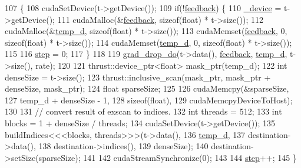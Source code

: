 \begin{DoxyCode}
107                                                                          \{
108     cudaSetDevice(t->getDevice());
109     \textcolor{keywordflow}{if}(!\hyperlink{classmarian_1_1GradientDropBase_aba05eed3ccef8a7a9907265c5bb71113}{feedback}) \{
110       \hyperlink{classmarian_1_1GradientDropBase_a2ad2b7d1cb32b380dbf5e87672f0cf55}{\_device} = t->getDevice();
111       cudaMalloc(&\hyperlink{classmarian_1_1GradientDropBase_aba05eed3ccef8a7a9907265c5bb71113}{feedback}, \textcolor{keyword}{sizeof}(\textcolor{keywordtype}{float}) * t->size());
112       cudaMalloc(&\hyperlink{classmarian_1_1GradientDropBase_a90fc3332c4dbfbb0e59e421db411be27}{temp\_d}, \textcolor{keyword}{sizeof}(\textcolor{keywordtype}{float}) * t->size());
113       cudaMemset(\hyperlink{classmarian_1_1GradientDropBase_aba05eed3ccef8a7a9907265c5bb71113}{feedback}, 0, \textcolor{keyword}{sizeof}(\textcolor{keywordtype}{float}) * t->size());
114       cudaMemset(\hyperlink{classmarian_1_1GradientDropBase_a90fc3332c4dbfbb0e59e421db411be27}{temp\_d}, 0, \textcolor{keyword}{sizeof}(\textcolor{keywordtype}{float}) * t->size());
115 
116       \hyperlink{classmarian_1_1GradientDropBase_acead9d9d021ef412b7e62776c96a5e51}{step} = 0;
117     \}
118 
119     \hyperlink{classmarian_1_1GradientDropBase_af88d41a0e4f999745653b61276426d8a}{grad\_drop\_do}(t->data(), \hyperlink{classmarian_1_1GradientDropBase_aba05eed3ccef8a7a9907265c5bb71113}{feedback}, \hyperlink{classmarian_1_1GradientDropBase_a90fc3332c4dbfbb0e59e421db411be27}{temp\_d}, t->size(), rate);
120 
121     thrust::device\_ptr<float> mask\_ptr(temp\_d);
122     \textcolor{keywordtype}{int} denseSize = t->size();
123     thrust::inclusive\_scan(mask\_ptr, mask\_ptr + denseSize, mask\_ptr);
124     \textcolor{keywordtype}{float} sparseSize;
125 
126     cudaMemcpy(&sparseSize,
127                temp\_d + denseSize - 1,
128                \textcolor{keyword}{sizeof}(\textcolor{keywordtype}{float}),
129                cudaMemcpyDeviceToHost);
130 
131     \textcolor{comment}{// convert result of exscan to indices.}
132     \textcolor{keywordtype}{int} threads = 512;
133     \textcolor{keywordtype}{int} blocks = 1 + denseSize / threads;
134     cudaSetDevice(t->getDevice());
135     buildIndices<<<blocks, threads>>>(t->data(),
136                                       \hyperlink{classmarian_1_1GradientDropBase_a90fc3332c4dbfbb0e59e421db411be27}{temp\_d},
137                                       destination->data(),
138                                       destination->indices(),
139                                       denseSize);
140     destination->setSize(sparseSize);
141 
142     cudaStreamSynchronize(0);
143 
144     \hyperlink{classmarian_1_1GradientDropBase_acead9d9d021ef412b7e62776c96a5e51}{step}++;
145   \}
\end{DoxyCode}



